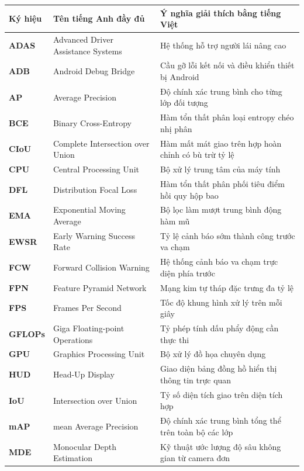 \documentclass[12pt,a4paper]{article}
\begin{document}
\begin{table}[htbp]
\centering
\small
\begin{tabularx}{\textwidth}{l p{5.5cm} X}
\toprule
\textbf{Ký hiệu} & \textbf{Tên tiếng Anh đầy đủ} & \textbf{Ý nghĩa giải thích bằng tiếng Việt} \\
\midrule
\textbf{ADAS} & Advanced Driver Assistance Systems & Hệ thống hỗ trợ người lái nâng cao \\
\textbf{ADB} & Android Debug Bridge & Cầu gỡ lỗi kết nối và điều khiển thiết bị Android \\
\textbf{AP} & Average Precision & Độ chính xác trung bình cho từng lớp đối tượng \\
\textbf{BCE} & Binary Cross-Entropy & Hàm tổn thất phân loại entropy chéo nhị phân \\
\textbf{CIoU} & Complete Intersection over Union & Hàm mất mát giao trên hợp hoàn chỉnh có bù trừ tỷ lệ \\
\textbf{CPU} & Central Processing Unit & Bộ xử lý trung tâm của máy tính \\
\textbf{DFL} & Distribution Focal Loss & Hàm tổn thất phân phối tiêu điểm hồi quy hộp bao \\
\textbf{EMA} & Exponential Moving Average & Bộ lọc làm mượt trung bình động hàm mũ \\
\textbf{EWSR} & Early Warning Success Rate & Tỷ lệ cảnh báo sớm thành công trước va chạm \\
\textbf{FCW} & Forward Collision Warning & Hệ thống cảnh báo va chạm trực diện phía trước \\
\textbf{FPN} & Feature Pyramid Network & Mạng kim tự tháp đặc trưng đa tỷ lệ \\
\textbf{FPS} & Frames Per Second & Tốc độ khung hình xử lý trên mỗi giây \\
\textbf{GFLOPs} & Giga Floating-point Operations & Tỷ phép tính dấu phẩy động cần thực thi \\
\textbf{GPU} & Graphics Processing Unit & Bộ xử lý đồ họa chuyên dụng \\
\textbf{HUD} & Head-Up Display & Giao diện bảng đồng hồ hiển thị thông tin trực quan \\
\textbf{IoU} & Intersection over Union & Tỷ số diện tích giao trên diện tích hợp \\
\textbf{mAP} & mean Average Precision & Độ chính xác trung bình tổng thể trên toàn bộ các lớp \\
\textbf{MDE} & Monocular Depth Estimation & Kỹ thuật ước lượng độ sâu không gian từ camera đơn \\

\end{tabularx}
\end{table}
\end{document}
